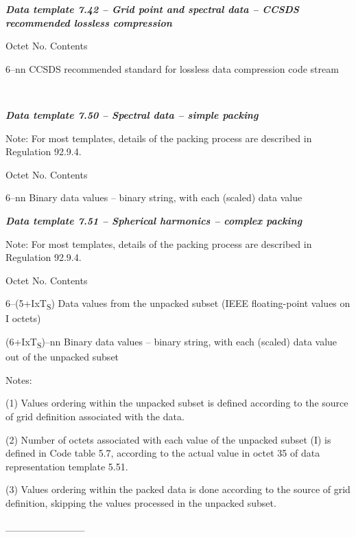 \emph{\textbf{Data template 7.42 -- Grid point and spectral data -- CCSDS recommended lossless compression}}

Octet No. Contents

6--nn CCSDS recommended standard for lossless data compression code stream

\emph{\textbf{\\
}}

\emph{\textbf{Data template 7.50 -- Spectral data -- simple packing}}

Note: For most templates, details of the packing process are described in Regulation 92.9.4.

Octet No. Contents

6--nn Binary data values -- binary string, with each (scaled) data value

\emph{\textbf{Data template 7.51 -- Spherical harmonics -- complex packing}}

Note: For most templates, details of the packing process are described in Regulation 92.9.4.

Octet No. Contents

6--(5+IxT\textsubscript{S}) Data values from the unpacked subset (IEEE floating-point values on I octets)

(6+IxT\textsubscript{S})--nn Binary data values -- binary string, with each (scaled) data value out of the unpacked subset

Notes:

(1) Values ordering within the unpacked subset is defined according to the source of grid definition associated with the data.

(2) Number of octets associated with each value of the unpacked subset (I) is defined in Code table 5.7, according to the actual value in octet 35 of data representation template 5.51.

(3) Values ordering within the packed data is done according to the source of grid definition, skipping the values processed in the unpacked subset.

\_\_\_\_\_\_\_\_\_\_\_
